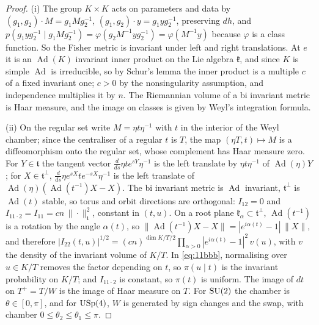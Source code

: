 \begin{proof}
(i) The group $K\times K$ acts on parameters and data by $(g_1,g_2)\cdot M=g_1Mg_2^{-1}$, $(g_1,g_2)\cdot y=g_1yg_2^{-1}$, preserving $dh$, and $p(g_1yg_2^{-1}\mid g_1Mg_2^{-1})=\varphi(g_2M^{-1}yg_2^{-1})=\varphi(M^{-1}y)$ because $\varphi$ is a class function. So the Fisher metric is invariant under left and right translations. At $e$ it is an $\operatorname{Ad}(K)$ invariant inner product on the Lie algebra $\mathfrak k$, and since $K$ is simple $\operatorname{Ad}$ is irreducible, so by Schur's lemma the inner product is a multiple $c$ of a fixed invariant one; $c>0$ by the nonsingularity assumption, and independence multiplies it by $n$. The Riemannian volume of a bi invariant metric is Haar measure, and the image on classes is given by Weyl's integration formula.

(ii) On the regular set write $M=\eta t\eta^{-1}$ with $t$ in the interior of the Weyl chamber; since the centraliser of a regular $t$ is $T$, the map $(\eta T,t)\mapsto M$ is a diffeomorphism onto the regular set, whose complement has Haar measure zero. For $Y\in\mathfrak t$ the tangent vector $\frac{d}{ds}\eta te^{sY}\eta^{-1}$ is the left translate by $\eta t\eta^{-1}$ of $\operatorname{Ad}(\eta)Y$; for $X\in\mathfrak t^\perp$, $\frac{d}{ds}\eta e^{sX}te^{-sX}\eta^{-1}$ is the left translate of $\operatorname{Ad}(\eta)(\operatorname{Ad}(t^{-1})X-X)$. The bi invariant metric is $\operatorname{Ad}$ invariant, $\mathfrak t^\perp$ is $\operatorname{Ad}(t)$ stable, so torus and orbit directions are orthogonal: $I_{12}=0$ and $I_{11\cdot2}=I_{11}=cn\,\|\cdot\|^2_{\mathfrak t}$, constant in $(t,u)$. On a root plane $\mathfrak k_\alpha\subset\mathfrak t^\perp$, $\operatorname{Ad}(t^{-1})$ is a rotation by the angle $\alpha(t)$, so $\|\operatorname{Ad}(t^{-1})X-X\|=|e^{i\alpha(t)}-1|\,\|X\|$, and therefore $|I_{22}(t,u)|^{1/2}=(cn)^{\dim K/T/2}\prod_{\alpha>0}|e^{i\alpha(t)}-1|^2\,v(u)$, with $v$ the density of the invariant volume of $K/T$. In \eqref{eq:11bbb}, normalising over $u\in K/T$ removes the factor depending on $t$, so $\pi(u\mid t)$ is the invariant probability on $K/T$; and $I_{11\cdot2}$ is constant, so $\pi(t)$ is uniform. The image of $dt$ on $T^+=T/W$ is the image of Haar measure on $T$. For $\mathrm{SU}(2)$ the chamber is $\theta\in[0,\pi]$, and for $\mathrm{USp}(4)$, $W$ is generated by sign changes and the swap, with chamber $0\le\theta_2\le\theta_1\le\pi$.
\end{proof}

